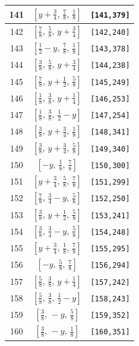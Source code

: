 \documentclass[fleqn,8pt]{jsarticle}
\begin{document}
\begin{longtable}{ccc}
141 & $\left[ y + \frac{3}{4},\, \frac{7}{8},\, \frac{1}{8} \right]$ & {\tt [141,379]} \\ \hline
142 & $\left[ \frac{7}{8},\, \frac{5}{8},\, y + \frac{3}{4} \right]$ & {\tt [142,240]} \\ \hline
143 & $\left[ \frac{1}{2} - y,\, \frac{7}{8},\, \frac{1}{8} \right]$ & {\tt [143,378]} \\ \hline
144 & $\left[ \frac{3}{8},\, \frac{5}{8},\, y + \frac{3}{4} \right]$ & {\tt [144,238]} \\ \hline
145 & $\left[ \frac{7}{8},\, y + \frac{1}{2},\, \frac{5}{8} \right]$ & {\tt [145,249]} \\ \hline
146 & $\left[ \frac{1}{8},\, \frac{3}{8},\, y + \frac{1}{4} \right]$ & {\tt [146,253]} \\ \hline
147 & $\left[ \frac{1}{8},\, \frac{3}{8},\, \frac{1}{2} - y \right]$ & {\tt [147,254]} \\ \hline
148 & $\left[ \frac{3}{8},\, y + \frac{3}{4},\, \frac{1}{8} \right]$ & {\tt [148,341]} \\ \hline
149 & $\left[ \frac{3}{8},\, y + \frac{3}{4},\, \frac{5}{8} \right]$ & {\tt [149,340]} \\ \hline
150 & $\left[ - y,\, \frac{1}{8},\, \frac{7}{8} \right]$ & {\tt [150,300]} \\ \hline
151 & $\left[ y + \frac{3}{4},\, \frac{5}{8},\, \frac{7}{8} \right]$ & {\tt [151,299]} \\ \hline
152 & $\left[ \frac{7}{8},\, \frac{3}{4} - y,\, \frac{5}{8} \right]$ & {\tt [152,250]} \\ \hline
153 & $\left[ \frac{3}{8},\, y + \frac{1}{2},\, \frac{5}{8} \right]$ & {\tt [153,241]} \\ \hline
154 & $\left[ \frac{3}{8},\, \frac{3}{4} - y,\, \frac{5}{8} \right]$ & {\tt [154,248]} \\ \hline
155 & $\left[ y + \frac{3}{4},\, \frac{1}{8},\, \frac{7}{8} \right]$ & {\tt [155,295]} \\ \hline
156 & $\left[ - y,\, \frac{5}{8},\, \frac{7}{8} \right]$ & {\tt [156,294]} \\ \hline
157 & $\left[ \frac{5}{8},\, \frac{3}{8},\, y + \frac{1}{4} \right]$ & {\tt [157,242]} \\ \hline
158 & $\left[ \frac{5}{8},\, \frac{3}{8},\, \frac{1}{2} - y \right]$ & {\tt [158,243]} \\ \hline
159 & $\left[ \frac{3}{8},\, - y,\, \frac{5}{8} \right]$ & {\tt [159,352]} \\ \hline
160 & $\left[ \frac{3}{8},\, - y,\, \frac{1}{8} \right]$ & {\tt [160,351]} \\ \hline

\end{longtable}
\end{document}
